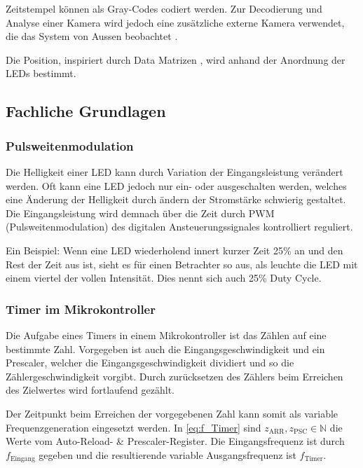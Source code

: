 Zeitstempel können als Gray-Codes codiert werden.
%
Zur Decodierung und Analyse einer Kamera wird jedoch eine zusätzliche externe Kamera verwendet, die das System von Aussen beobachtet \cite{7836493}.

Die Position, inspiriert durch Data Matrizen \cite{data-matrix}, wird anhand der Anordnung der LEDs bestimmt.


\subsection{Fachliche Grundlagen} %

\subsubsection{Pulsweitenmodulation} %

Die Helligkeit einer LED kann durch Variation der Eingangsleistung verändert werden.
%
Oft kann eine LED jedoch nur ein- oder ausgeschalten werden, welches eine Änderung der Helligkeit durch ändern der Stromstärke schwierig gestaltet.
%
Die Eingangsleistung wird demnach über die Zeit durch PWM (Pulsweitenmodulation) des digitalen Ansteuerungssignales kontrolliert reguliert.


Ein Beispiel:
%
Wenn eine LED wiederholend innert kurzer Zeit 25\% an und den Rest der Zeit aus ist, sieht es für einen Betrachter so aus, als leuchte die LED mit einem viertel der vollen Intensität.
%
Dies nennt sich auch 25\% Duty Cycle.


\subsubsection{Timer im Mikrokontroller} %

Die Aufgabe eines Timers in einem Mikrokontroller ist das Zählen auf eine bestimmte Zahl.
%
Vorgegeben ist auch die Eingangsgeschwindigkeit und ein Prescaler, welcher die Eingangsgeschwindigkeit dividiert und so die Zählergeschwindigkeit vorgibt.
%
Durch zurücksetzen des Zählers beim Erreichen des Zielwertes wird fortlaufend gezählt.


Der Zeitpunkt beim Erreichen der vorgegebenen Zahl kann somit als variable Frequenzgeneration eingesetzt werden.
%
In \eqref{eq:f_Timer} sind $z_\text{ARR}, z_\text{PSC} \in \mathbb{N}$ die Werte vom Auto-Reload- \& Prescaler-Register.
%
Die Eingangsfrequenz ist durch $f_\text{Eingang}$ gegeben und die resultierende variable Ausgangsfrequenz ist $f_\text{Timer}$.

